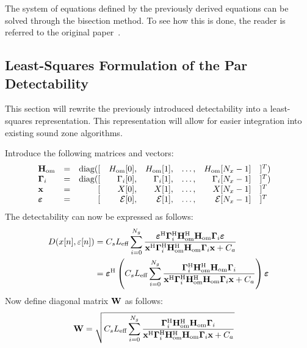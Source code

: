 The system of equations defined by the previously derived equations can be solved through the bisection method.
To see how this is done, the reader is referred to the original paper~\cite{van2005perceptual}.

\subsection{Least-Squares Formulation of the Par Detectability}
\label{ch:perceptual:implementation:least_squares}
This section will rewrite the previously introduced detectability into a least-squares representation. 
This representation will allow for easier integration into existing sound zone algorithms.

Introduce the following matrices and vectors:
\begin{equation}
    \begin{array}{llrrrrrll}
        \mathbf{H}_\text{om}   &=  &\text{diag}([& H_\text{om}[0],& H_\text{om}[1],&    \hdots,& H_\text{om}[N_x - 1]&]^T)& \\
        \mathbf{\Gamma}_i      &=  &\text{diag}([&    \Gamma_i[0],&    \Gamma_i[1],&    \hdots,&    \Gamma_i[N_x - 1]&]^T)& \\
        \mathbf{x}             &=  &            [&           X[0],&           X[1],&    \hdots,&           X[N_x - 1]&]^T& \\
  \boldsymbol{\varepsilon}   &=  &            [& \mathcal{E}[0],& \mathcal{E}[1],&    \hdots,& \mathcal{E}[N_x - 1]&]^T& \\
    \end{array}
\end{equation}
The detectability can now be expressed as follows:
\begin{align}
    D(x[n],\varepsilon[n]) &= C_s L_\text{eff}\sum_{i=0}^{N_g} 
        \frac{\boldsymbol{\varepsilon}^{\text{H}}\mathbf{\Gamma}_i^{\text{H}}\mathbf{H}_\text{om}^{\text{H}}\mathbf{H}_\text{om}\mathbf{\Gamma}_i\boldsymbol{\varepsilon}}
        {\mathbf{x}^{\text{H}}\mathbf{\Gamma}_i^{\text{H}}\mathbf{H}_\text{om}^{\text{H}}\mathbf{H}_\text{om}\mathbf{\Gamma}_i\mathbf{x} + C_a} \\
                           &= \boldsymbol{\varepsilon}^{\text{H}}\left(C_s L_\text{eff}\sum_{i=0}^{N_g} 
        \frac{\mathbf{\Gamma}_i^{\text{H}}\mathbf{H}_\text{om}^{\text{H}}\mathbf{H}_\text{om}\mathbf{\Gamma}_i}
        {\mathbf{x}^{\text{H}}\mathbf{\Gamma}_i^{\text{H}}\mathbf{H}_\text{om}^{\text{H}}\mathbf{H}_\text{om}\mathbf{\Gamma}_i\mathbf{x} + C_a}\right)\boldsymbol{\varepsilon}
\end{align}
Now define diagonal matrix $\mathbf{W}$ as follows: 
\begin{align}
    \mathbf{W} &= \sqrt{C_s L_\text{eff}\sum_{i=0}^{N_g} 
        \frac{\mathbf{\Gamma}_i^{\text{H}}\mathbf{H}_\text{om}^{\text{H}}\mathbf{H}_\text{om}\mathbf{\Gamma}_i}
    {\mathbf{x}^{\text{H}}\mathbf{\Gamma}_i^{\text{H}}\mathbf{H}_\text{om}^{\text{H}}\mathbf{H}_\text{om}\mathbf{\Gamma}_i\mathbf{x} + C_a}}
\end{align}
